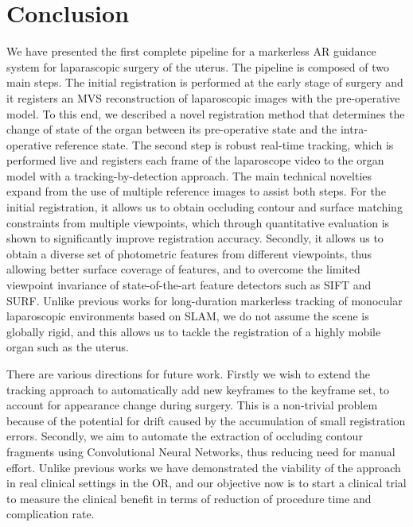 \documentclass[journal]{IEEEtran}
\begin{document}











  
\section{Conclusion}
\label{sec:conclusion}
We have presented the first complete pipeline for a markerless AR guidance system for laparascopic surgery of the uterus. The pipeline is composed of two main steps. The initial registration is performed at the early stage of surgery and it registers an MVS reconstruction of laparoscopic images with the pre-operative model. To this end, we described a novel registration method that determines the change of state of the organ between its pre-operative state and the intra-operative reference state. The second step is robust real-time tracking, which is performed live and registers each frame of the laparoscope video to the organ model with a tracking-by-detection approach. The main technical novelties expand from the use of multiple reference images to assist both steps. For the initial registration, it allows us to obtain occluding contour and surface matching constraints from multiple viewpoints, which through quantitative evaluation is shown to significantly improve registration accuracy. Secondly, it allows us to obtain a diverse set of photometric features from different viewpoints, thus allowing better surface coverage of features, and to overcome the limited viewpoint invariance of state-of-the-art feature detectors such as SIFT and SURF. Unlike previous works for long-duration markerless tracking of monocular laparoscopic environments based on SLAM, we do not assume the scene is globally rigid, and this allows us to tackle the registration of a highly mobile organ such as the uterus. 

There are various directions for future work. Firstly we wish to extend the tracking approach to automatically add new keyframes to the keyframe set, to account for appearance change during surgery. This is a non-trivial problem because of the potential for drift caused by the accumulation of small registration errors. Secondly, we aim to automate the extraction of occluding contour fragments using Convolutional Neural Networks, thus reducing need for manual effort. Unlike previous works we have demonstrated the viability of the approach in real clinical settings in the OR, and our objective now is to start a clinical trial to measure the clinical benefit in terms of reduction of procedure time and complication rate.
\end{document}
